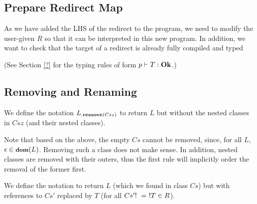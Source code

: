 \subsection{Prepare Redirect Map}
As we have added the LHS of the redirect to the program, we need to modify the user-given $R$ so that it can be interpreted in this new program. In addition, we want to check that the target of a redirect is already fully compiled and typed 

\begin{defs}
\end{defs}
(See Section \ref{?} for the typing rules of form $p \vdash T : \textbf{Ok}$.)

\subsection{Removing and Renaming}

We define the notation $L{{}_{.\textbf{remove}({Csz})}}$ to return $L$ but without the nested classes in $Csz$ (and their nested classes).

\begin{defs}
\end{defs}

Note that based on the above, the empty $Cs$ cannot be removed, since, for all $L$, $\epsilon \in {\ensuremath{\footnotesize{\textbf{dom}}({L})}}$. Removing such a class does not make sense. In addition, nested classes are removed with their outers, thus the first rule will implicitly order the removal of the former first.

We define the notation  to return $L$ (which we found in class $Cs$) but with references to $Cs'$ replaced by $T$ (for all $\redm{Cs'}{T} \in R$). 

\begin{defs}
\end{defs}


